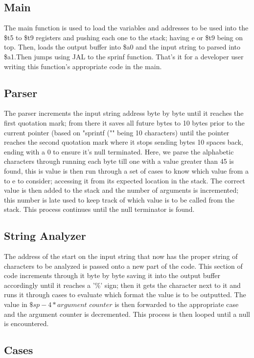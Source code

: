 \documentclass[12pt,a4paper]{article}
\begin{document}
\subsection{Main}
The main function is used to load the variables and addresses to be used into the \$t5 to \$t9 registers and pushing each one to the stack; having e or \$t9 being on top. Then, loads the output buffer into \$a0 and the input string to parsed into \$a1.Then jumps using JAL to the sprinf function. That's it for a developer user writing this function's appropriate code in the main.

\subsection{Parser}
The parser increments the input string address byte by byte until it reaches the first quotation mark; from there it saves all future bytes to 10 bytes prior to the current pointer (based on "sprintf ("" being 10 characters) until the pointer reaches the second quotation mark where it stops sending bytes 10 spaces back, ending with a 0 to ensure it's null terminated. Here, we parse the alphabetic characters through running each byte till one with a value greater than 45 is found, this is value is then run through a set of cases to know which value from a to e to consider; accessing it from its expected location in the stack. The correct value is then added to the stack and the number of arguments is incremented; this number is late used to keep track of which value is to be called from the stack. This process continues until the null terminator is found.

\subsection{String Analyzer}
The address of the start on the input string that now has the proper string of characters to be analyzed is passed onto a new part of the code. This section of code increments through it byte by byte saving it into the output buffer accordingly until it reaches a '\%' sign; then it gets the character next to it and runs it through cases to evaluate which format the value is to be outputted. The value in $\$sp - 4 * argument$ $counter$ is then forwarded to the appropriate case and the argument counter is decremented. This process is then looped until a null is encountered.

\subsection{Cases}
\end{document}
